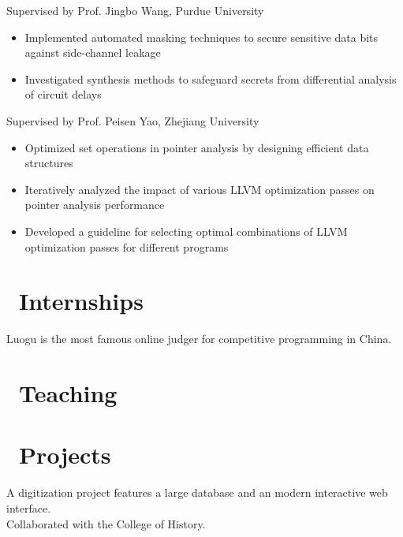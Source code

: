 \documentclass{resume}
\begin{document}
Supervised by Prof. Jingbo Wang, Purdue University
\begin{itemize}[itemsep=0.5ex]  
  \item Implemented automated masking techniques to secure sensitive data bits against side-channel leakage  
  \item Investigated synthesis methods to safeguard secrets from differential analysis of circuit delays  
\end{itemize}

Supervised by Prof. Peisen Yao, Zhejiang University
\begin{itemize}[itemsep=0.5ex]
  \item Optimized set operations in pointer analysis by designing efficient data structures
  \item Iteratively analyzed the impact of various LLVM optimization passes on pointer analysis performance
  \item Developed a guideline for selecting optimal combinations of LLVM optimization passes for different programs
\end{itemize}

\section{\faUsers\ Internships}
Luogu is the most famous online judger for competitive programming in China.

\section{\faBook\ Teaching}

\section{\faCode\ Projects}
A digitization project features a large database and an modern interactive web interface.\\
Collaborated with the College of History.
\end{document}

